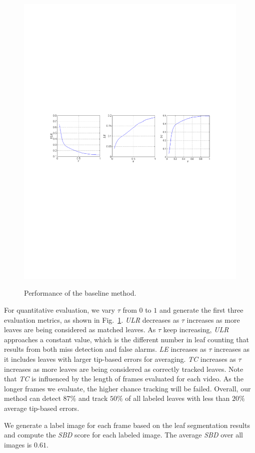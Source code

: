 \begin{figure}
\centering
\includegraphics[width=.98\textwidth]{Figures/performance.pdf}\\
\caption{Performance of the baseline method.}
\label{fig:performance}
\end{figure}

For quantitative evaluation, we vary $\tau$ from $0$ to $1$ and generate the first three evaluation metrics, as shown in Fig.~\ref{fig:performance}.
{\it{ULR}} decreases as $\tau$ increases as more leaves are being considered as matched leaves.
As $\tau$ keep increasing, {\it{ULR}} approaches a constant value, which is the different number in leaf counting that results from both miss detection and false alarms.
{\it{LE}} increases as $\tau$ increases as it includes leaves with larger tip-based errors for averaging.
{\it{TC}} increases as $\tau$ increases as more leaves are being considered as correctly tracked leaves.
Note that {\it{TC}} is influenced by the length of frames evaluated for each video. 
As the longer frames we evaluate, the higher chance tracking will be failed. 
Overall, our method can detect $87\%$ and track $50\%$ of all labeled leaves with less than $20\%$ average tip-based errors.

We generate a label image for each frame based on the leaf segmentation results and compute the {\it{SBD}} score for each labeled image.
The average {\it{SBD}} over all images is $0.61$.









